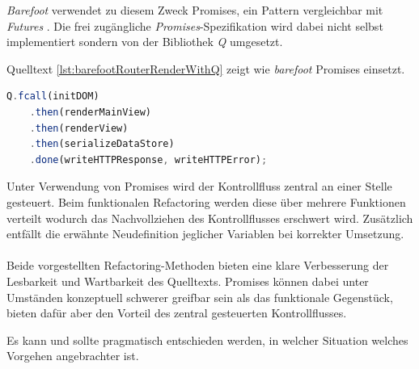 \emph{Barefoot} verwendet zu diesem Zweck Promises, ein Pattern vergleichbar mit \emph{Futures} \cite{FuturesAndPromises}. Die frei zugängliche \emph{Promises}-Spezifikation \cite{PromisesAPlusSpec} wird dabei nicht selbst implementiert sondern von der Bibliothek \emph{Q} \cite{QLibrary} umgesetzt.

Quelltext \ref{lst:barefootRouterRenderWithQ} zeigt wie \emph{barefoot} Promises einsetzt.

\begin{lstlisting}[language=JavaScript, firstnumber=215, caption={Ausschnitt aus server/router-mixin.js \cite{barefootRouterRenderWithQ}}, label={lst:barefootRouterRenderWithQ}]
	Q.fcall(initDOM)
	.then(renderMainView)
	.then(renderView)
	.then(serializeDataStore)
	.done(writeHTTPResponse, writeHTTPError);
\end{lstlisting}

Unter Verwendung von Promises wird der Kontrollfluss zentral an einer Stelle gesteuert. Beim funktionalen Refactoring werden diese über mehrere Funktionen verteilt wodurch das Nachvollziehen des Kontrollflusses erschwert wird. Zusätzlich entfällt die erwähnte Neudefinition jeglicher Variablen bei korrekter Umsetzung.
\\ \\
Beide vorgestellten Refactoring-Methoden bieten eine klare Verbesserung der Lesbarkeit und Wartbarkeit des Quelltexts. Promises können dabei unter Umständen konzeptuell schwerer greifbar sein als das funktionale Gegenstück, bieten dafür aber den Vorteil des zentral gesteuerten Kontrollflusses.

Es kann und sollte pragmatisch entschieden werden, in welcher Situation welches Vorgehen angebrachter ist.